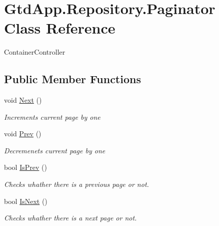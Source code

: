 \hypertarget{class_gtd_app_1_1_repository_1_1_paginator}{}\section{Gtd\+App.\+Repository.\+Paginator Class Reference}
\label{class_gtd_app_1_1_repository_1_1_paginator}


Container\+Controller  


\subsection*{Public Member Functions}
\begin{DoxyCompactItemize}
\item 
void \mbox{\hyperlink{class_gtd_app_1_1_repository_1_1_paginator_a86e79209fe0fc10c09b0022acd393093}{Next}} ()
\begin{DoxyCompactList}\small\item\em Increments current page by one \end{DoxyCompactList}\item 
void \mbox{\hyperlink{class_gtd_app_1_1_repository_1_1_paginator_a470f4f40477e236284e74f19a204e103}{Prev}} ()
\begin{DoxyCompactList}\small\item\em Decremenets current page by one \end{DoxyCompactList}\item 
bool \mbox{\hyperlink{class_gtd_app_1_1_repository_1_1_paginator_a4ae54d0e48b7228d90a599b3e2450229}{Is\+Prev}} ()
\begin{DoxyCompactList}\small\item\em Checks whather there is a previous page or not. \end{DoxyCompactList}\item 
bool \mbox{\hyperlink{class_gtd_app_1_1_repository_1_1_paginator_a16f01f9dcbe513466fb415b8cd3ca094}{Is\+Next}} ()
\begin{DoxyCompactList}\small\item\em Checks whather there is a next page or not. \end{DoxyCompactList}\end{DoxyCompactItemize}
